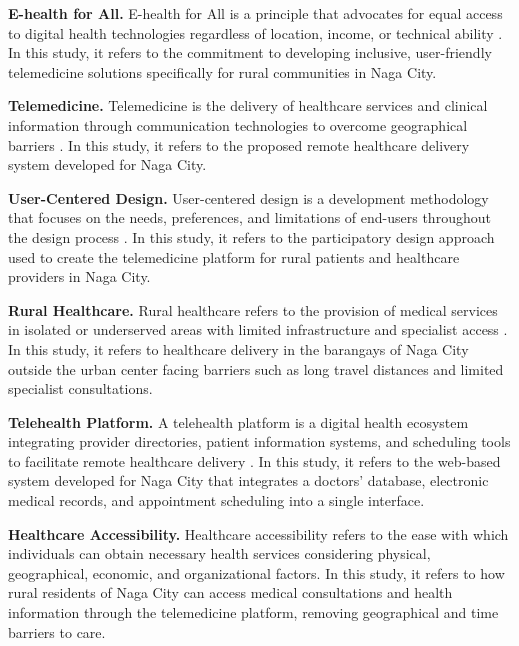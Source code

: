 \documentclass{research}
\begin{document}
\textbf{E-health for All.} E-health for All is a principle that advocates for equal access to
digital health technologies regardless of location, income, or technical ability \cite{Kepper2024}.
In this study, it refers to the commitment to developing inclusive, user-friendly telemedicine
solutions specifically for rural communities in Naga City.

\textbf{Telemedicine.} Telemedicine is the delivery of healthcare services and clinical
information through communication technologies to overcome geographical barriers \cite{Li2025}.
In this study, it refers to the proposed remote healthcare delivery system developed for Naga
City.

\textbf{User-Centered Design.} User-centered design is a development methodology that focuses on
the needs, preferences, and limitations of end-users throughout the design process \cite{ISO9241}.
In this study, it refers to the participatory design approach used to create the telemedicine
platform for rural patients and healthcare providers in Naga City.

\textbf{Rural Healthcare.} Rural healthcare refers to the provision of medical services in
isolated or underserved areas with limited infrastructure and specialist access \cite{CDC2025}. In
this study, it refers to healthcare delivery in the barangays of Naga City outside the urban
center facing barriers such as long travel distances and limited specialist consultations.

\textbf{Telehealth Platform.} A telehealth platform is a digital health ecosystem integrating
provider directories, patient information systems, and scheduling tools to facilitate remote
healthcare delivery \cite{SPro2024}. In this study, it refers to the web-based system developed
for Naga City that integrates a doctors' database, electronic medical records, and appointment
scheduling into a single interface.

\textbf{Healthcare Accessibility.} Healthcare accessibility refers to the ease with which
individuals can obtain necessary health services considering physical, geographical, economic, and
organizational factors. In this study, it refers to how rural residents of Naga City can access
medical consultations and health information through the telemedicine platform, removing
geographical and time barriers to care.

\end{document}
